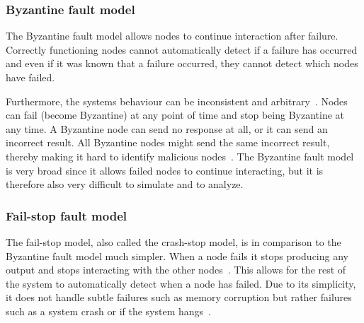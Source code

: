 \documentclass{cslthse-msc}
\begin{document}
\subsubsection{Byzantine fault model} \label{subsub:background_byzantine}
The Byzantine fault model allows nodes to continue interaction after failure. Correctly functioning nodes cannot automatically detect if a failure has occurred and even if it was known that a failure occurred, they cannot detect which nodes have failed. 

Furthermore, the systems behaviour can be inconsistent and arbitrary~\cite{surveyFaultParallel}. Nodes can fail (become Byzantine) at any point of time and stop being Byzantine at any time. A Byzantine node can send no response at all, or it can send an incorrect result. All Byzantine nodes might send the same incorrect result, thereby making it hard to identify malicious nodes~\cite{selfAdaptRel}. %
The Byzantine fault model is very broad since it allows failed nodes to continue interacting, but it is therefore also very difficult to simulate and to analyze.


\subsubsection{Fail-stop fault model} \label{subsub:background_fail_stop}
The fail-stop model, also called the crash-stop model, is in comparison to the Byzantine fault model much simpler. When a node fails it stops producing any output and stops interacting with the other nodes~\cite{faultTolerantFundamentals}. This allows for the rest of the system to automatically detect when a node has failed. Due to its simplicity, it does not handle subtle failures such as memory corruption but rather failures such as a system crash or if the system hangs~\cite{surveyFaultParallel}. %

\end{document}
